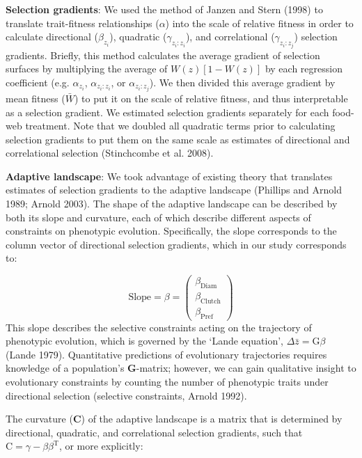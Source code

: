 \documentclass[11pt,]{article}
\begin{document}
\textbf{Selection gradients}: We used the method of Janzen and Stern
(1998) to translate trait-fitness relationships (\(\alpha\)) into the
scale of relative fitness in order to calculate directional
(\(\beta_{z_i}\)), quadratic (\(\gamma_{z_i:z_i}\)), and correlational
(\(\gamma_{z_i:z_j}\)) selection gradients. Briefly, this method
calculates the average gradient of selection surfaces by multiplying the
average of \(W(z)[1-W(z)]\) by each regression coefficient (e.g.
\(\alpha_{z_i}\), \(\alpha_{z_i:z_i}\), or \(\alpha_{z_i:z_j}\)). We
then divided this average gradient by mean fitness (\(\bar W\)) to put
it on the scale of relative fitness, and thus interpretable as a
selection gradient. We estimated selection gradients separately for each
food-web treatment. Note that we doubled all quadratic terms prior to
calculating selection gradients to put them on the same scale as
estimates of directional and correlational selection (Stinchcombe et al.
2008).

\textbf{Adaptive landscape}: We took advantage of existing theory that
translates estimates of selection gradients to the adaptive landscape
(Phillips and Arnold 1989; Arnold 2003). The shape of the adaptive
landscape can be described by both its slope and curvature, each of
which describe different aspects of constraints on phenotypic evolution.
Specifically, the slope corresponds to the column vector of directional
selection gradients, which in our study corresponds to:

\[\text{Slope} = \beta = \begin{pmatrix} \beta_{\text{Diam}} \\ \beta_{\text{Clutch}} \\ \beta_{\text{Pref}} \end{pmatrix} \]
This slope describes the selective constraints acting on the trajectory
of phenotypic evolution, which is governed by the `Lande equation',
\(\Delta \bar z=\text{G}\beta\) (Lande 1979). Quantitative predictions
of evolutionary trajectories requires knowledge of a population's
\textbf{G}-matrix; however, we can gain qualitative insight to
evolutionary constraints by counting the number of phenotypic traits
under directional selection (selective constraints, Arnold 1992).

The curvature (\textbf{C}) of the adaptive landscape is a matrix that is
determined by directional, quadratic, and correlational selection
gradients, such that
\boldmath\(\text{C}=\gamma - \beta \beta^\text{T}\), or more explicitly:
\end{document}

